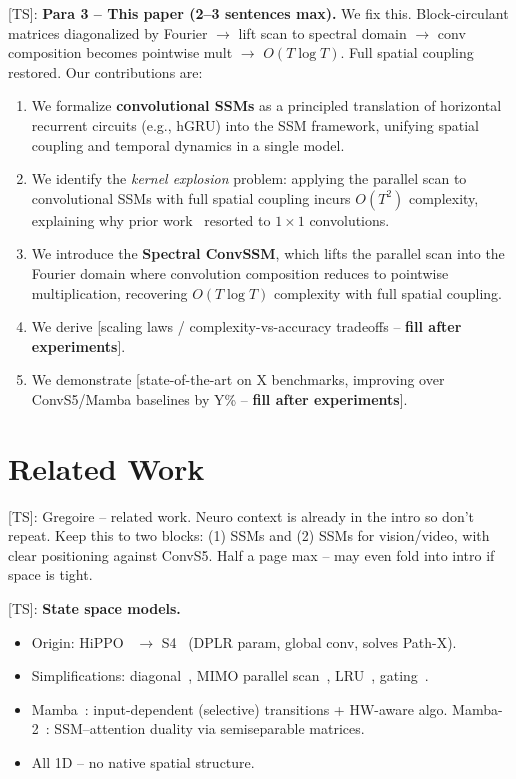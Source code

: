 \documentclass{article}
\newcommand{\TS}[1]{{\color{pink}[TS]: #1}}
\begin{document}
\TS{%
\textbf{Para 3 -- This paper (2--3 sentences max).}
We fix this. Block-circulant matrices diagonalized by Fourier $\to$ lift scan to spectral domain $\to$ conv composition becomes pointwise mult $\to$ $O(T \log T)$. Full spatial coupling restored.
%
Our contributions are:
\begin{enumerate}[leftmargin=*,topsep=2pt,itemsep=1pt]
\item We formalize \textbf{convolutional SSMs} as a principled translation of horizontal recurrent circuits (e.g., hGRU) into the SSM framework, unifying spatial coupling and temporal dynamics in a single model.
\item We identify the \emph{kernel explosion} problem: applying the parallel scan to convolutional SSMs with full spatial coupling incurs $O(T^2)$ complexity, explaining why prior work~\citep{smith2023convs5} resorted to $1\times 1$ convolutions.
\item We introduce the \textbf{Spectral ConvSSM}, which lifts the parallel scan into the Fourier domain where convolution composition reduces to pointwise multiplication, recovering $O(T\log T)$ complexity with full spatial coupling.
\item We derive [scaling laws / complexity-vs-accuracy tradeoffs -- \textbf{fill after experiments}].
\item We demonstrate [state-of-the-art on X benchmarks, improving over ConvS5/Mamba baselines by Y\% -- \textbf{fill after experiments}].
\end{enumerate}}

\section{Related Work}

\TS{Gregoire -- related work. Neuro context is already in the intro so don't repeat. Keep this to two blocks: (1) SSMs and (2) SSMs for vision/video, with clear positioning against ConvS5. Half a page max -- may even fold into intro if space is tight.}

\TS{%
\textbf{State space models.}
\begin{itemize}
\item Origin: HiPPO~\citep{gu2020} $\to$ S4~\citep{gu2022} (DPLR param, global conv, solves Path-X).
\item Simplifications: diagonal~\citep{gu2022s4d,gupta2022}, MIMO parallel scan~\citep{smith2023s5}, LRU~\citep{orvieto2023}, gating~\citep{mehta2023}.
\item Mamba~\citep{gu2023}: input-dependent (selective) transitions + HW-aware algo. Mamba-2~\citep{dao2024}: SSM--attention duality via semiseparable matrices.
\item All 1D -- no native spatial structure.
\end{itemize}}
\end{document}
